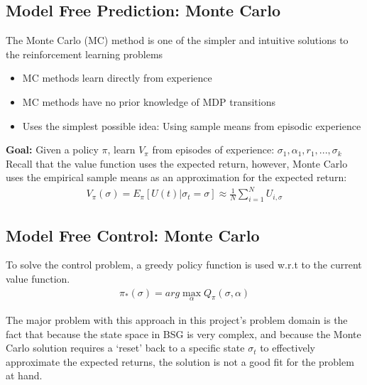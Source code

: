 \documentclass[ %
                    author={Ashwinder Khurana},
                supervisor={Prof Dave Cliff},
                    degree={MEng},
                     title={The Deeply Reinforced Trader},
                  subtitle={},
                      type={enterprise},
                      year={2020} ]{dissertation}
\begin{document}
{\subsection{Model Free Prediction: Monte Carlo }
\label{Monte Carlo Prediction}
The Monte Carlo (MC) method is one of the simpler and intuitive solutions to the reinforcement learning problems
\begin{itemize}
\item MC methods learn directly from experience
\item MC methods have no prior knowledge of MDP transitions 
\item Uses the simplest possible idea: Using sample means from episodic experience 
\end{itemize}

\noindent
\textbf{Goal: } Given a policy $\pi$, learn $V_\pi$ from episodes of experience: $\sigma_1, \alpha_1, r_1,..., \sigma_k$
Recall that the value function uses the expected return, however, Monte Carlo uses the empirical sample means as an approximation for the expected return:
\begin{equation}
\label{Monte Carlo Mean}
\begin{split}
V_\pi (\sigma) = E_\pi [U(t) | \sigma_t = \sigma] \approx \frac{1}{N} \sum\limits^{N}_{i=1}{U_{i,\sigma}}
\end{split}
\end{equation}
\noindent 

\subsection{Model Free Control: Monte Carlo}
To solve the control problem, a greedy policy function is used w.r.t to the current value function. 
\begin{equation}
\label{Monte Carlo Control}
\begin{split}
\pi_*(\sigma) = arg\max\limits^{}_{\alpha}{Q_\pi(\sigma,\alpha)}
\end{split}
\end{equation}

\noindent
The major problem with this approach in this project's problem domain is the fact that because the state space in BSG is very complex, and because the Monte Carlo solution requires a \enquote*{reset} back to a specific state ${\sigma_t}$ to effectively approximate the expected returns, the solution is not a good fit for the problem at hand. 

}
\end{document}
